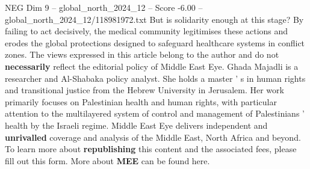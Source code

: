 \begin{textsample}{NEG Dim 9 – global\_north\_2024\_12 – Score -6.00 – global\_north\_2024\_12/118981972.txt}
But is solidarity enough at this stage?
By failing to act decisively, the medical community legitimises these actions and erodes the global protections designed to safeguard healthcare systems in conflict zones.
The views expressed in this article belong to the author and do not \textbf{necessarily} reflect the editorial policy of Middle East Eye.
Ghada Majadli is a researcher and Al-Shabaka policy analyst.
She holds a master ' s in human rights and transitional justice from the Hebrew University in Jerusalem.
Her work primarily focuses on Palestinian health and human rights, with particular attention to the multilayered system of control and management of Palestinians ' health by the Israeli regime.
Middle East Eye delivers independent and \textbf{unrivalled} coverage and analysis of the Middle East, North Africa and beyond.
To learn more about \textbf{republishing} this content and the associated fees, please fill out this form.
More about \textbf{MEE} can be found here.

\end{textsample}
